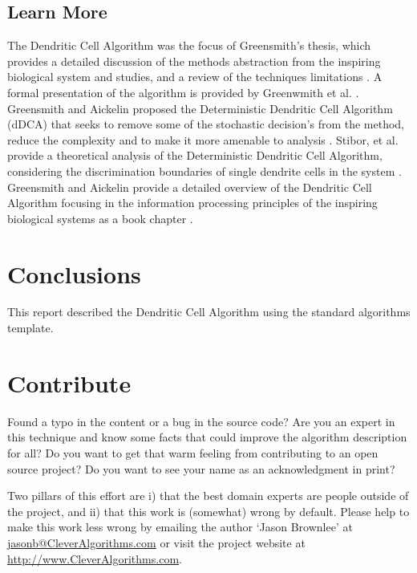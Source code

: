\documentclass[a4paper, 11pt]{article}
\makeatletter
\newcommand{\myreportauthor}{Jason Brownlee}
\newcommand{\myreportemail}{jasonb@CleverAlgorithms.com}
\newcommand{\myreportwebsite}{http://www.CleverAlgorithms.com}
\makeatother
\begin{document}
% 
% 
\subsection{Learn More}
The Dendritic Cell Algorithm was the focus of Greensmith's thesis, which provides a detailed discussion of the methods abstraction from the inspiring biological system and studies, and a review of the techniques limitations \cite{Greensmith2007}. 
A formal presentation of the algorithm is provided by Greenwmith et al. \cite{Greensmith2006a}.
Greensmith and Aickelin proposed the Deterministic Dendritic Cell Algorithm (dDCA) that seeks to remove some of the stochastic decision's from the method, reduce the complexity and to make it more amenable to analysis \cite{Greensmith2008}.
Stibor, et al. provide a theoretical analysis of the Deterministic Dendritic Cell Algorithm, considering the discrimination boundaries of single dendrite cells in the system \cite{Stibor2009}. 
Greensmith and Aickelin provide a detailed overview of the Dendritic Cell Algorithm focusing in the information processing principles of the inspiring biological systems as a book chapter \cite{Greensmith2009}.

% 
% 
\section{Conclusions}
\label{sec:conclusions}
This report described the Dendritic Cell Algorithm using the standard algorithms template.

% 
% 
\section{Contribute}
\label{sec:contribute}
Found a typo in the content or a bug in the source code? 
Are you an expert in this technique and know some facts that could improve the algorithm description for all?
Do you want to get that warm feeling from contributing to an open source project? 
Do you want to see your name as an acknowledgment in print?

Two pillars of this effort are i) that the best domain experts are people outside of the project, and ii) that this work is (somewhat) wrong by default. 
Please help to make this work less wrong by emailing the author `\myreportauthor' at \url{\myreportemail} or visit the project website at \url{\myreportwebsite}.



\end{document}
